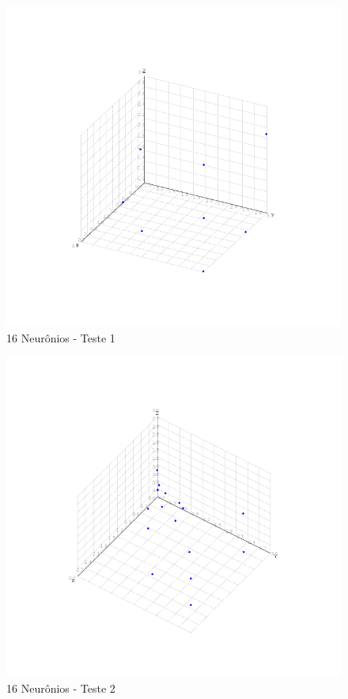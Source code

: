 \begin{figure}[ht!]
	\centering
	\includegraphics[scale=0.4]{./imgs/fig:out_16_teste_1}
	\caption{16 Neurônios - Teste 1}
	\label{fig:out_16_teste_1}
\end{figure}

\begin{figure}[ht!]
	\centering
	\includegraphics[scale=0.4]{./imgs/fig:out_16_teste_2}
	\caption{16 Neurônios - Teste 2}
	\label{fig:out_16_teste_2}
\end{figure}

